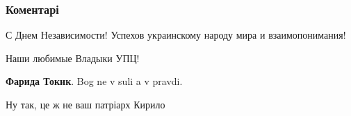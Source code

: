  
 
 
 
 
\subsubsection{Коментарі}
\label{sec:24_08_2021.fb.mitropolit_antonij.1.sobor_sofia_varfolomej.cmt}

\begin{itemize}
 
С Днем Независимости! Успехов украинскому народу мира и взаимопонимания!

 
Наши любимые Владыки УПЦ!

\begin{itemize}
 
\textbf{Фарида Токик}. Bog ne v suli a v pravdi.
\end{itemize}

 
Ну так, це ж не ваш патріарх Кирило

\begin{itemize}
 

\end{itemize}
\end{itemize}
